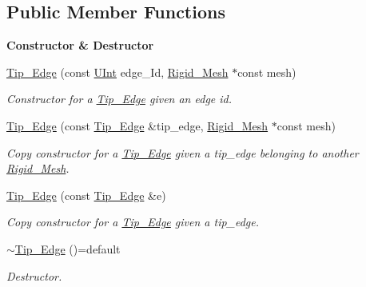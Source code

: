 \subsection*{Public Member Functions}
\begin{Indent}{\bf Constructor \& Destructor}\par
\begin{DoxyCompactItemize}
\item 
\hyperlink{classFVCode3D_1_1Rigid__Mesh_1_1Tip__Edge_a23920018412184dcf82796ad6f192c9c}{Tip\+\_\+\+Edge} (const \hyperlink{namespaceFVCode3D_a4bf7e328c75d0fd504050d040ebe9eda}{U\+Int} edge\+\_\+\+Id, \hyperlink{classFVCode3D_1_1Rigid__Mesh}{Rigid\+\_\+\+Mesh} $\ast$const mesh)
\begin{DoxyCompactList}\small\item\em Constructor for a \hyperlink{classFVCode3D_1_1Rigid__Mesh_1_1Tip__Edge}{Tip\+\_\+\+Edge} given an edge id. \end{DoxyCompactList}\item 
\hyperlink{classFVCode3D_1_1Rigid__Mesh_1_1Tip__Edge_a8417ce9c51f2674970b1fd9939654d11}{Tip\+\_\+\+Edge} (const \hyperlink{classFVCode3D_1_1Rigid__Mesh_1_1Tip__Edge}{Tip\+\_\+\+Edge} \&tip\+\_\+edge, \hyperlink{classFVCode3D_1_1Rigid__Mesh}{Rigid\+\_\+\+Mesh} $\ast$const mesh)
\begin{DoxyCompactList}\small\item\em Copy constructor for a \hyperlink{classFVCode3D_1_1Rigid__Mesh_1_1Tip__Edge}{Tip\+\_\+\+Edge} given a tip\+\_\+edge belonging to another \hyperlink{classFVCode3D_1_1Rigid__Mesh}{Rigid\+\_\+\+Mesh}. \end{DoxyCompactList}\item 
\hyperlink{classFVCode3D_1_1Rigid__Mesh_1_1Tip__Edge_ac4f63ce3e8a54683d44f3d338a1fabcc}{Tip\+\_\+\+Edge} (const \hyperlink{classFVCode3D_1_1Rigid__Mesh_1_1Tip__Edge}{Tip\+\_\+\+Edge} \&e)
\begin{DoxyCompactList}\small\item\em Copy constructor for a \hyperlink{classFVCode3D_1_1Rigid__Mesh_1_1Tip__Edge}{Tip\+\_\+\+Edge} given a tip\+\_\+edge. \end{DoxyCompactList}\item 
\hyperlink{classFVCode3D_1_1Rigid__Mesh_1_1Tip__Edge_a042b20ced5d7ec9a79243092da96ff49}{$\sim$\+Tip\+\_\+\+Edge} ()=default
\begin{DoxyCompactList}\small\item\em Destructor. \end{DoxyCompactList}\end{DoxyCompactItemize}
\end{Indent}
